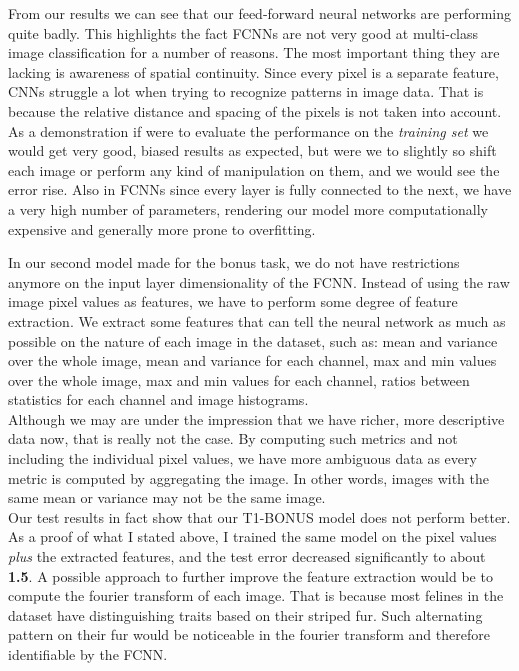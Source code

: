 \documentclass[tikz,14pt,fleqn]{article}
\begin{document}
From our results we can see that our feed-forward neural networks are performing quite badly. This highlights the fact FCNNs are not very good at multi-class image classification for a number of reasons. The most important thing they are lacking is awareness of spatial continuity. Since every pixel is a separate feature, CNNs struggle a lot when trying to recognize patterns in image data. That is because the relative distance and spacing of the pixels is not taken into account. As a demonstration if were to evaluate the performance on the \textit{training set} we would get very good, biased results as expected, but were we to slightly so shift each image or perform any kind of manipulation on them, and we would see the error rise. Also in FCNNs since every layer is fully connected to the next, we have a very high number of parameters, rendering our model more computationally expensive and generally more prone to overfitting.

In our second model made for the bonus task, we do not have restrictions anymore on the input layer dimensionality of the FCNN. Instead of using the raw image pixel values as features, we have to perform some degree of feature extraction. We extract some features that can tell the neural network as much as possible on the nature of each image in the dataset, such as: mean and variance over the whole image, mean and variance for each channel, max and min values over the whole image, max and min values for each channel, ratios between statistics for each channel and image histograms.\\
Although we may are under the impression that we have richer, more descriptive data now, that is really not the case. By computing such metrics and not including the individual pixel values, we have more ambiguous data as every metric is computed by aggregating the image. In other words, images with the same mean or variance may not be the same image.\\
Our test results in fact show that our T1-BONUS model does not perform better. As a proof of what I stated above, I trained the same model on the pixel values \textit{plus} the extracted features, and the test error decreased significantly to about \textbf{1.5}. A possible approach to further improve the feature extraction would be to compute the fourier transform of each image. That is because most felines in the dataset have distinguishing traits based on their striped fur. Such alternating pattern on their fur would be noticeable in the fourier transform and therefore identifiable by the FCNN.
\end{document}
